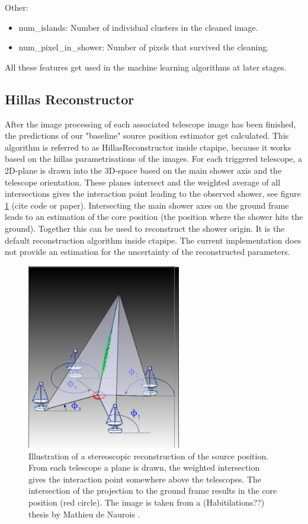 Other:
\begin{itemize}
    \item{num\_islands: Number of individual clusters in the cleaned image.}
    \item{num\_pixel\_in\_shower: Number of pixels that survived the cleaning.}
\end{itemize}

All these features get used in the machine learning algorithms at later stages.

\subsection{Hillas Reconstructor}  %
After the image processing of each associated telescope image has been finished,
the predictions of our "baseline" source position estimator get calculated.
This algorithm is referred to as HillasReconstructor inside ctapipe, because 
it works based on the hillas parametrisations of the images.
For each triggered telescope, a 2D-plane is drawn into the 3D-space based on the main shower 
axis and the telescope orientation. These planes intersect and 
the weighted average of all intersections gives the 
interaction point leading to the observed shower,
see figure \ref{fig:hillas_reconstructor} (cite code or paper).
Intersecting the main shower axes on the ground frame leads to 
an estimation of the core position (the position where the 
shower hits the ground).
Together this can be used to reconstruct the shower origin.
It is the default reconstruction algorithm inside ctapipe.
The current implementation does not provide an 
estimation for the uncertainty of the reconstructed parameters.

\begin{figure}
	\centering
	\includegraphics[width=0.6\textwidth]{images/hillas_reco.png}
	\caption{Illustration of a stereoscopic reconstruction of the source position.
    From each telescope a plane is drawn, the weighted intersection gives the interaction 
    point somewhere above the telescopes. The intersection of the projection to 
    the ground frame results in the core position (red circle). 
    The image is taken from a (Habitilations??) thesis by 
    Mathieu de Naurois \cite{hillas_reco}.}
	\label{fig:hillas_reconstructor}
\end{figure}

